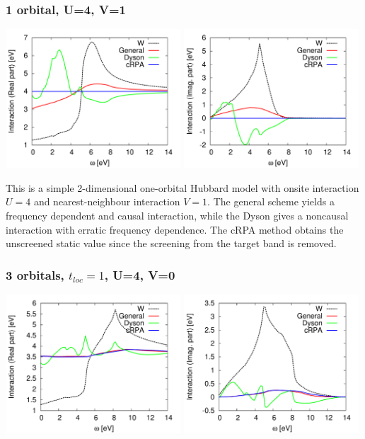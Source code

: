 \documentclass[12pt,a4paper]{scrartcl}
\numberwithin{equation}{section}
\begin{document}
\subsubsection{1 orbital, U=4, V=1}
\includegraphics[width=0.49\textwidth]{figs/bathNonlocFromDMFTderiv/1orb_U4_V1_real.pdf}
\includegraphics[width=0.49\textwidth]{figs/bathNonlocFromDMFTderiv/1orb_U4_V1_imag.pdf}

This is a simple 2-dimensional one-orbital Hubbard model with onsite interaction $U=4$ and nearest-neighbour
interaction $V=1$. The general scheme yields a frequency dependent and causal interaction, 
while the Dyson gives a noncausal interaction with erratic frequency dependence.
The cRPA method obtains the unscreened static value since the screening from the target band is removed.

\subsubsection{3 orbitals, $t_{loc}=1$, U=4, V=0}
\includegraphics[width=0.49\textwidth]{figs/bathNonlocFromDMFTderiv/3orb_U4_V0_real.pdf}
\includegraphics[width=0.49\textwidth]{figs/bathNonlocFromDMFTderiv/3orb_U4_V0_imag.pdf}
\end{document}

